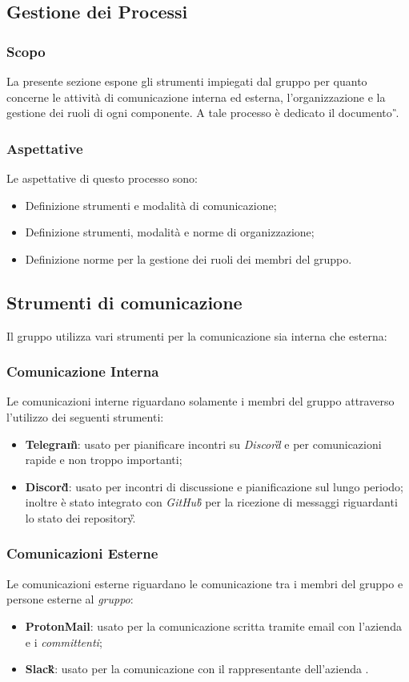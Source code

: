 \subsection{Gestione dei Processi} %
\subsubsection{Scopo}
La presente sezione espone gli strumenti impiegati dal gruppo \teamname{} per quanto concerne le attività di comunicazione interna ed esterna, l'organizzazione e la gestione dei ruoli di ogni componente.
A tale processo è dedicato il documento \PdP{}\textit{\G}.

\subsubsection{Aspettative}
Le aspettative di questo processo sono:
\begin{itemize}
	\item Definizione strumenti e modalità di comunicazione;
	\item Definizione strumenti, modalità e norme di organizzazione;
	\item Definizione norme per la gestione dei ruoli dei membri del gruppo.
\end{itemize}

\subsection{Strumenti di comunicazione}
Il gruppo \teamname{} utilizza vari strumenti per la comunicazione sia interna che esterna:
	\subsubsection{Comunicazione Interna}
		Le comunicazioni interne riguardano solamente i membri del gruppo \teamname{} attraverso l'utilizzo dei seguenti strumenti:
			\begin{itemize}
				\item \textbf{Telegram\G}: usato per pianificare incontri su \emph{Discord}\G{} e per comunicazioni rapide e non troppo importanti;
				\item \textbf{Discord\G}: usato per incontri di discussione e pianificazione sul lungo periodo; inoltre è stato integrato con \emph{GitHub\G{}} per la ricezione di messaggi riguardanti lo stato dei repository\G.
			\end{itemize}
	\subsubsection{Comunicazioni Esterne}
	\label{sec:Comunicazioni Esterne}
		Le comunicazioni esterne riguardano le comunicazione tra i membri del gruppo \teamname e persone esterne al \emph{gruppo}:
			\begin{itemize}
				\item \textbf{ProtonMail}: usato per la comunicazione scritta tramite email con l'azienda \proponente e i \emph{committenti};
				\item \textbf{Slack\G}: usato per la comunicazione con il rappresentante dell'azienda \proponente.
			\end{itemize}
		
